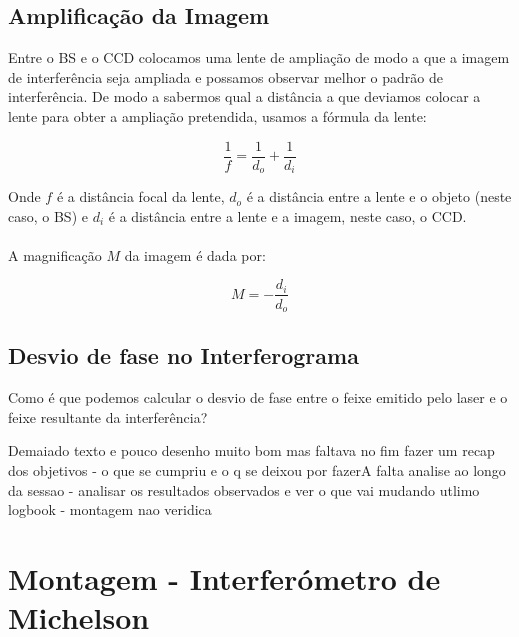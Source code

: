 \documentclass{article}
\begin{document}
\begin{multicols}{2}
\subsection{Amplificação da Imagem}

Entre o BS e o CCD colocamos uma lente de ampliação de modo a que a imagem de interferência seja ampliada e possamos observar melhor o padrão de interferência.
De modo a sabermos qual a distância a que deviamos colocar a lente para obter a ampliação pretendida, usamos a fórmula da lente:

\[ \frac{1}{f} = \frac{1}{d_o} + \frac{1}{d_i} \]

Onde $f$ é a distância focal da lente, $d_o$ é a distância entre a lente e o objeto (neste caso, o BS) e $d_i$ é a distância entre a lente e a imagem, neste caso, o CCD.
\paragraph{}
A magnificação $M$ da imagem é dada por:

\[ M = - \frac{d_i}{d_o} \]

\subsection{Desvio de fase no Interferograma}

Como é que podemos calcular o desvio de fase entre o feixe emitido pelo laser e o feixe resultante da interferência?

Demaiado texto e pouco desenho
muito bom mas faltava no fim fazer um recap dos objetivos - o que se cumpriu e o q se deixou por fazerA
falta analise ao longo da sessao - analisar os resultados observados e ver o que vai mudando
utlimo logbook - montagem nao veridica

\end{multicols}



\newpage

\section{Montagem - Interferómetro de Michelson}

\vspace{3cm}
\end{document}
